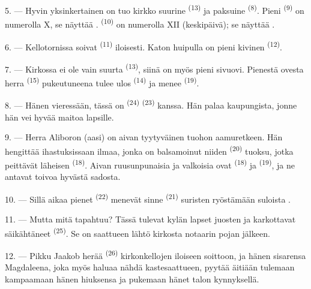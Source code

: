 \VUsaut{3.4mm}
\VUsaut{3.0mm}

5. --- Hyvin yksinkertainen on tuo kirkko suurine 
\textsuperscript{(13)} ja paksuine  \textsuperscript{(8)}.
Pieni  \textsuperscript{(9)} on numerolla X, se näyttää
.  \textsuperscript{(10)} on numerolla XII
(keskipäivä); se näyttää .

6. --- Kellotornissa soivat  \textsuperscript{(11)}
iloisesti. Katon huipulla on pieni kivinen 
\textsuperscript{(12)}.

7. --- Kirkossa ei ole vain suurta 
\textsuperscript{(13)}, siinä on myös pieni sivuovi. Pienestä ovesta herra
 \textsuperscript{(15)} 
pukeutuneena tulee ulos  \textsuperscript{(14)} ja menee
 \textsuperscript{(19)}.

8. --- Hänen vieressään, tässä on  \textsuperscript{(24)}
 \textsuperscript{(23)} kanssa. Hän palaa kaupungista, jonne hän
vei hyvää maitoa lapsille.

\VUsaut{4.0mm}
\VUsaut{3.4mm}

9. --- Herra Aliboron (aasi) on aivan tyytyväinen tuohon aamuretkeen. Hän
hengittää ihastuksissaan ilmaa, jonka on balsamoinut niiden 
\textsuperscript{(20)} tuoksu, jotka peittävät läheisen 
 \textsuperscript{(18)}. Aivan ruusunpunaisia ja valkoisia
ovat  \textsuperscript{(18)} ja 
\textsuperscript{(19)}, ja ne antavat toivoa hyvästä sadosta.

10. --- Sillä aikaa pienet  \textsuperscript{(22)} menevät
sinne  \textsuperscript{(21)} suristen ryöstämään
suloista .

11. --- Mutta mitä tapahtuu? Tässä tulevat kylän lapset juosten ja karkottavat
säikähtäneet  \textsuperscript{(25)}. Se on saattueen lähtö
kirkosta notaarin pojan  jälkeen.

12. --- Pikku Jaakob herää  \textsuperscript{(26)}
kirkonkellojen iloiseen soittoon, ja hänen sisarensa Magdaleena, joka myös
haluaa nähdä kastesaattueen, pyytää äitiään tulemaan kampaamaan hänen hiuksensa
ja pukemaan hänet talon kynnyksellä.

